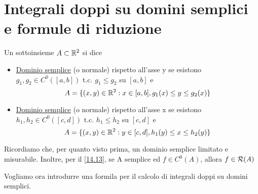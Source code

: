 \section{Integrali doppi su domini semplici e formule di riduzione}
\begin{definition}
  Un sottoinsieme $A \subset \mathbb{R}^2$ si dice 
  \begin{itemize}
    \item \underline{Dominio semplice} (o normale) rispetto all'asse y se esistono 
          $g_1, g_2 \in C^0([a,b])$ t.c. $g_1 \leq g_2$ su $[a,b]$ e 
          $$A = \{(x,y)\in\mathbb{R}^2 : x \in [a,b], g_1(x) \leq y \leq g_2(x)\}$$
    \item \underline{Dominio semplice} (o normale) rispetto all'asse x se esistono 
          $h_1, h_2 \in C^0([c,d])$ t.c. $h_1 \leq h_2$ su $[c,d]$ e 
          $$A = \{(x,y)\in\mathbb{R}^2 : y \in [c,d], h_1(y) \leq x \leq h_2(y)\}$$
  \end{itemize}
\end{definition}
\begin{osservazione}
  Ricordiamo che, per quanto visto prima, un dominio semplice \ace limitato e misurabile. Inoltre, per il 
  \ref{14.13}, se A \ace semplice ed $f \in C^0(A)$, allora $f\in \mathcal{R}(A)$
\end{osservazione}
Vogliamo ora introdurre una formila per il calcolo di integrali doppi su domini semplici.
